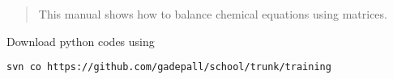 \documentclass[journal,12pt,twocolumn]{IEEEtran}
\renewcommand\thesection{\arabic{section}}
\begin{document}
%

\begin{abstract}
This manual shows how to balance chemical equations using matrices.
\end{abstract}
Download python codes using 
\begin{lstlisting}
svn co https://github.com/gadepall/school/trunk/training
\end{lstlisting}


\renewcommand{\theequation}{\theenumi}
\end{document}
